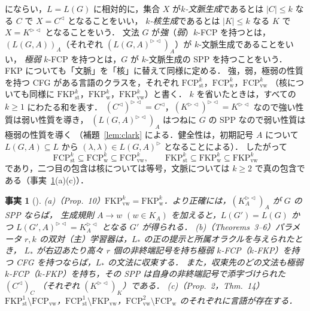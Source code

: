 \documentclass[11pt,a4paper]{ltjsarticle}
\numberwithin{equation}{section}
\theoremstyle{plain}
\newtheorem{fact}[theorem]{事実}
\theoremstyle{definition}
\theoremstyle{remark}
\theoremstyle{plain}
\newcommand{\eps}{\lambda}
\newcommand{\R}{^{\rhd}}
\newcommand{\Lc}{^{\lhd}}
\newcommand{\RL}{^{\rhd\lhd}}
\newcommand{\FCP}[2]{\mathrm{FCP}^{#1}_{\mathrm{#2}}}
\newcommand{\FKP}[2]{\mathrm{FKP}^{#1}_{\mathrm{#2}}}
\begin{document}
\citet[Sec.~3]{ky2017} にならい，$L=L(G)$ に相対的に，集合 $X$ が\emph{$k$-文脈生成}であるとは $|C|\le k$ なる $C$ で $X=C\Lc$ となることをいい，
\emph{$k$-核生成}であるとは $|K|\le k$ なる $K$ で $X=K\RL$ となることをいう．
文法 $G$ が\emph{強}（\emph{弱}）$k$-FCP を持つとは，$(L(G,A))_A$（それぞれ $(L(G,A)\RL)_A$）が $k$-文脈生成であることをいい，
\emph{極弱} $k$-FCP を持つとは，$G$ が $k$-文脈生成の SPP を持つことをいう．
FKP についても「文脈」を「核」に替えて同様に定める．
強，弱，極弱の性質を持つ CFG がある言語のクラスを，それぞれ $\FCP{k}{st}$，$\FCP{k}{w}$，$\FCP{k}{vw}$
（核についても同様に $\FKP{k}{st}$，$\FKP{k}{w}$，$\FKP{k}{vw}$）と書く．
$k$ を省いたときは，すべての $k\ge1$ にわたる和を表す．
$(C\Lc)\RL=C\Lc$，$(K\RL)\RL=K\RL$ なので強い性質は弱い性質を導き，
$(L(G,A)\RL)_A$ はつねに $G$ の SPP なので弱い性質は極弱の性質を導く
（補題~\ref{lem:clark} による．健全性は，初期記号 $A$ について $L(G,A)\subseteq L$ から $(\eps,\eps)\in L(G,A)\R$ となることによる）．
したがって
\[
\FCP{k}{st}\subseteq\FCP{k}{w}\subseteq\FCP{k}{vw},\qquad
\FKP{k}{st}\subseteq\FKP{k}{w}\subseteq\FKP{k}{vw}
\]
であり，二つ目の包含は核については等号，文脈については $k\ge2$ で真の包含である（事実~\ref{fact:ky}(a)(c)）．

\begin{fact}[\citealp{ky2017}]\label{fact:ky}
(a)（Prop.~10）$\FKP{k}{vw}=\FKP{k}{w}$．より正確には，$(K_A\RL)_A$ が $G$ の SPP ならば，
生成規則 $A\to w$ $(w\in K_A)$ を加えると，$L(G')=L(G)$ かつ $L(G',A)\RL=K_A\RL$ となる $G'$ が得られる．
(b)（Theorems~3--6）パラメータ $r,k$ の双対（主）学習器は，$L_*$ の正の提示と所属オラクルを与えられたとき，
$L_*$ が右辺あたり高々 $r$ 個の非終端記号を持ち極弱 $k$-FCP（$k$-FKP）を持つ CFG を持つならば，$L_*$ の文法に収束する．
また，収束先のどの文法も極弱 $k$-FCP（$k$-FKP）を持ち，その SPP は自身の非終端記号で添字づけられた $(C\Lc)_C$
（それぞれ $(K\RL)_K$）である．
(c)（Prop.~2，Thm.~14）$\FKP1{st}\setminus\FCP{}{vw}$，$\FCP1{st}\setminus\FKP{}{vw}$，$\FCP2{vw}\setminus\FCP{}{w}$
のそれぞれに言語が存在する．
\end{fact}
\end{document}
